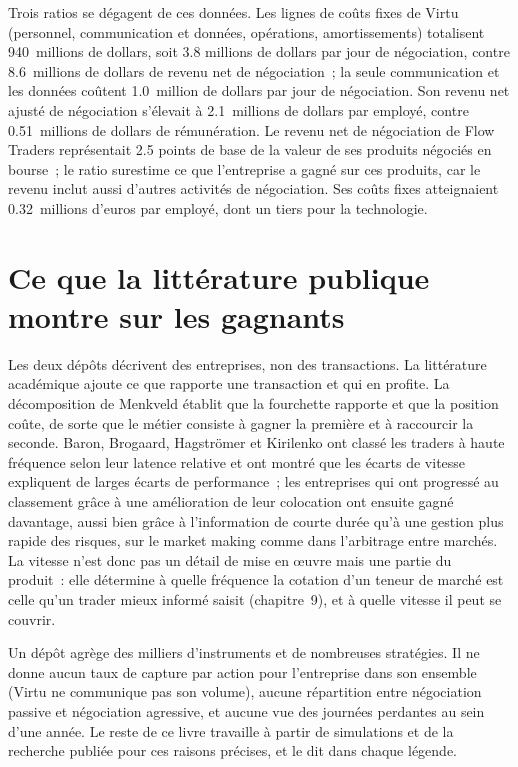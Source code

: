 Trois ratios se dégagent de ces données. Les lignes de coûts fixes de Virtu (personnel, communication et données, opérations, amortissements) totalisent 940~millions de dollars, soit 3.8
millions de dollars par jour de négociation, contre 8.6~millions de dollars de revenu net de négociation~; la seule communication et les données coûtent 1.0~million de dollars par jour de négociation. Son revenu net ajusté
de négociation s'élevait à 2.1~millions de dollars par employé, contre 0.51~millions de dollars de rémunération. Le revenu net de négociation de Flow Traders représentait 2.5 points de base de
la valeur de ses produits négociés en bourse~; le ratio surestime ce que l'entreprise a gagné sur ces produits, car le revenu inclut aussi d'autres activités de négociation. Ses
coûts fixes atteignaient 0.32~millions d'euros par employé, dont un tiers pour la technologie.

\section{Ce que la littérature publique montre sur les gagnants}

Les deux dépôts décrivent des entreprises, non des transactions. La littérature académique ajoute ce que rapporte une transaction et qui en profite. La décomposition de Menkveld établit que la
fourchette rapporte et que la position coûte, de sorte que le métier consiste à gagner la première et à raccourcir la seconde. Baron, Brogaard, Hagströmer et Kirilenko ont classé
les traders à haute fréquence selon leur latence relative et ont montré que les écarts de vitesse expliquent de larges écarts de performance~; les entreprises qui ont progressé au
classement grâce à une amélioration de leur colocation ont ensuite gagné davantage, aussi bien grâce à l'information de courte durée qu'à une gestion plus rapide des risques, sur le market making comme
dans l'arbitrage entre marchés. La vitesse n'est donc pas un détail de mise en œuvre mais une partie du produit~: elle détermine à quelle fréquence la cotation d'un teneur de marché
est celle qu'un trader mieux informé saisit (chapitre~9), et à quelle vitesse il peut se couvrir.

\begin{remark}\label{rem:hf:the-business-of-market-making:limits}
Un dépôt agrège des milliers d'instruments et de nombreuses stratégies. Il ne donne aucun taux de capture par action pour l'entreprise dans son ensemble (Virtu ne communique pas son
volume), aucune répartition entre négociation passive et négociation agressive, et aucune vue des journées perdantes au sein d'une année. Le reste de ce livre travaille à partir de
simulations et de la recherche publiée pour ces raisons précises, et le dit dans chaque légende.
\end{remark}

